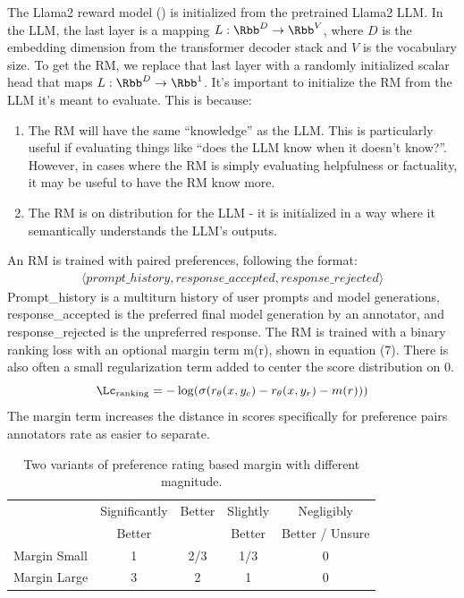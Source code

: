 \documentclass[
  letterpaper,
  DIV=11,
  numbers=noendperiod,
  oneside]{scrreprt}
\theoremstyle{remark}
\begin{document}
The Llama2 reward model () is
initialized from the pretrained Llama2 LLM. In the LLM, the last layer
is a mapping \(L: \Rbb^D \rightarrow \Rbb^V\), where \(D\) is the
embedding dimension from the transformer decoder stack and \(V\) is the
vocabulary size. To get the RM, we replace that last layer with a
randomly initialized scalar head that maps
\(L: \Rbb^D \rightarrow \Rbb^1\). It's important to initialize the RM
from the LLM it's meant to evaluate. This is because:

\begin{enumerate}
\def\labelenumi{\arabic{enumi}.}
\item
  The RM will have the same ``knowledge'' as the LLM. This is
  particularly useful if evaluating things like ``does the LLM know when
  it doesn't know?''. However, in cases where the RM is simply
  evaluating helpfulness or factuality, it may be useful to have the RM
  know more.
\item
  The RM is on distribution for the LLM - it is initialized in a way
  where it semantically understands the LLM's outputs.
\end{enumerate}

An RM is trained with paired preferences, following the format:
\[\begin{aligned}
    \langle prompt\_history, response\_accepted, response\_rejected \rangle
\end{aligned}\] Prompt\_history is a multiturn history of user prompts
and model generations, response\_accepted is the preferred final model
generation by an annotator, and response\_rejected is the unpreferred
response. The RM is trained with a binary ranking loss with an optional
margin term m(r), shown in equation (7). There is also often a small
regularization term added to center the score distribution on 0.
\[\Lc_{\text{ranking}} = -\log(\sigma(r_\theta(x,y_c) - r_\theta(x,y_r) - m(r)))\]
The margin term increases the distance in scores specifically for
preference pairs annotators rate as easier to separate.

\label{tab:margin_nums}
\begin{longtable}[]{@{}lcccc@{}}
\caption{Two variants of preference rating based margin with different
magnitude.}\tabularnewline
\toprule\noalign{}
\endfirsthead
\endhead
\bottomrule\noalign{}
\endlastfoot
& Significantly & Better & Slightly & Negligibly \\
& Better & & Better & Better / Unsure \\
Margin Small & 1 & 2/3 & 1/3 & 0 \\
Margin Large & 3 & 2 & 1 & 0 \\
\end{longtable}
\end{document}
